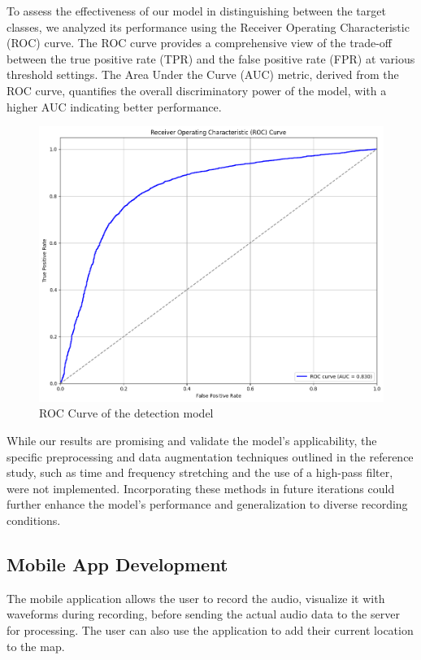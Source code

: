 To assess the effectiveness of our model in distinguishing between the target classes, we analyzed its performance using the Receiver Operating Characteristic (ROC) curve. The ROC curve provides a comprehensive view of the trade-off between the true positive rate (TPR) and the false positive rate (FPR) at various threshold settings. The Area Under the Curve (AUC) metric, derived from the ROC curve, quantifies the overall discriminatory power of the model, with a higher AUC indicating better performance.
\begin{figure}[h!]
    \centering
    \includegraphics[scale=0.35]{images/det_roc.png}
    \caption{ROC Curve of the detection model}
    \label{fig:ROC Curve}
\end{figure}

While our results are promising and validate the model's applicability, the specific preprocessing and data augmentation techniques outlined in the reference study, such as time and frequency stretching and the use of a high-pass filter, were not implemented. Incorporating these methods in future iterations could further enhance the model's performance and generalization to diverse recording conditions.

\newpage


\newpage

\subsection{Mobile App Development}
The mobile application allows the user to record the audio, visualize it with waveforms during recording, 
before sending the actual audio data to the server for processing. The user can also use the application to 
add their current location to the map. 

